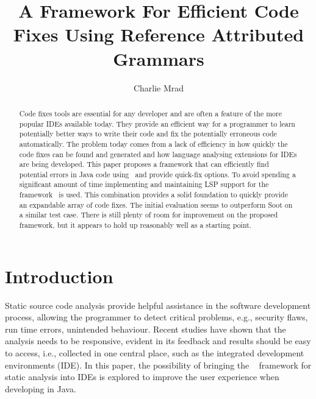 \documentclass[sigplan,10pt]{acmart}
\begin{document}
\title[Efficient Code Fixes]{A Framework For Efficient Code Fixes Using Reference Attributed Grammars}         %



\author{Charlie Mrad}



\begin{abstract}
Code fixes tools are essential for any developer and are often a feature of the more popular IDEs available today. They provide an efficient way for a programmer to learn potentially better ways to write their code and fix the potentially erroneous code automatically. The problem today comes from a lack of efficiency in how quickly the code fixes can be found and generated and how language analysing extensions for IDEs are being developed. This paper proposes a framework that can efficiently find potential errors in Java code using \intraj\ and provide quick-fix options. To avoid spending a significant amount of time implementing and maintaining LSP support for the framework \magpie\ is used. This combination provides a solid foundation to quickly provide an expandable array of code fixes. The initial evaluation seems to outperform Soot on a similar test case. There is still plenty of room for improvement on the proposed framework, but it appears to hold up reasonably well as a starting point.
\end{abstract}


\maketitle

\section{Introduction}
Static source code analysis provide helpful assistance in the software development process, allowing the programmer to detect critical problems, e.g., security flaws, run time errors, unintended behaviour. Recent studies \cite{tool_study1, tool_study2} have shown that the analysis needs to be responsive, evident in its feedback and results should be easy to access, i.e., collected in one central place, such as the integrated development environments (IDE). In this paper, the possibility of bringing the \intraj~\cite{intraj} framework for static analysis into IDEs is explored to improve the user experience when developing in Java.
\end{document}

